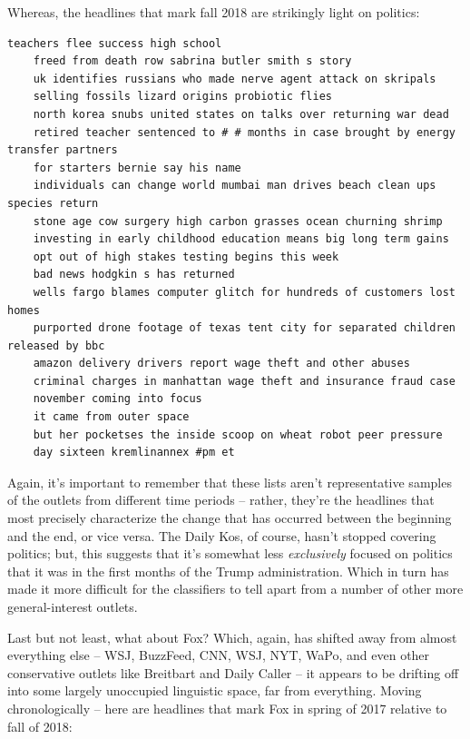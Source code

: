 \documentclass{scrartcl}
\begin{document}
Whereas, the headlines that mark fall 2018 are strikingly light on politics:

\begin{lstlisting}[basicstyle=\tiny\hlfont]
    teachers flee success high school
    freed from death row sabrina butler smith s story
    uk identifies russians who made nerve agent attack on skripals
    selling fossils lizard origins probiotic flies
    north korea snubs united states on talks over returning war dead
    retired teacher sentenced to # # months in case brought by energy transfer partners
    for starters bernie say his name
    individuals can change world mumbai man drives beach clean ups species return
    stone age cow surgery high carbon grasses ocean churning shrimp
    investing in early childhood education means big long term gains
    opt out of high stakes testing begins this week
    bad news hodgkin s has returned
    wells fargo blames computer glitch for hundreds of customers lost homes
    purported drone footage of texas tent city for separated children released by bbc
    amazon delivery drivers report wage theft and other abuses
    criminal charges in manhattan wage theft and insurance fraud case
    november coming into focus
    it came from outer space
    but her pocketses the inside scoop on wheat robot peer pressure
    day sixteen kremlinannex #pm et
\end{lstlisting}

Again, it's important to remember that these lists aren't representative samples of the outlets from different time periods -- rather, they're the headlines that most precisely characterize the change that has occurred between the beginning and the end, or vice versa. The Daily Kos, of course, hasn't stopped covering politics; but, this suggests that it's somewhat less \textit{exclusively} focused on politics that it was in the first months of the Trump administration. Which in turn has made it more difficult for the classifiers to tell apart from a number of other more general-interest outlets.

Last but not least, what about Fox? Which, again, has shifted away from almost everything else -- WSJ, BuzzFeed, CNN, WSJ, NYT, WaPo, and even other conservative outlets like Breitbart and Daily Caller -- it appears to be drifting off into some largely unoccupied linguistic space, far from everything. Moving chronologically -- here are headlines that mark Fox in spring of 2017 relative to fall of 2018:
\end{document}

